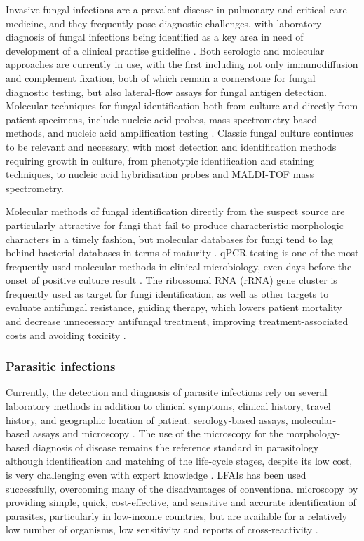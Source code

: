 Invasive fungal infections are a prevalent disease in pulmonary and critical care medicine, and they frequently pose diagnostic challenges, with laboratory diagnosis of fungal infections being identified as a key area in need of development of a clinical practise guideline \citep{haydour_diagnosis_2019}. Both serologic and molecular approaches are currently in use, with the first including not only immunodiffusion and complement fixation, both of which remain a cornerstone for fungal diagnostic testing, but also lateral-flow assays for fungal antigen detection. Molecular techniques for fungal identification both from culture and directly from patient specimens, include nucleic acid probes, mass spectrometry-based methods, and nucleic acid amplification testing \citep{ramanan_laboratory_2017}. Classic fungal culture continues to be relevant and necessary, with most detection and identification methods requiring growth in culture, from phenotypic identification and staining techniques, to nucleic acid hybridisation probes and MALDI-TOF mass spectrometry.  

Molecular methods of fungal identification directly from the suspect source are particularly attractive for fungi that fail to produce characteristic morphologic characters in a timely fashion, but molecular databases for fungi tend to lag behind bacterial databases in terms of maturity \citep{ramanan_laboratory_2017}. qPCR testing  is one of the most frequently used
molecular methods in clinical microbiology, even days before the onset of positive culture result \citep{kourkoumpetis_polymerase_2012}. The ribossomal RNA (rRNA) gene cluster is frequently used as target for fungi identification, as well as other targets to evaluate antifungal resistance, guiding therapy, which lowers patient mortality and decrease unnecessary antifungal treatment, improving treatment-associated costs and avoiding toxicity \citep{kourkoumpetis_polymerase_2012}. 

\subsubsection{Parasitic infections}

Currently, the detection and diagnosis of parasite infections rely on several laboratory methods in addition to clinical symptoms, clinical history, travel history, and geographic location of patient. serology-based assays, molecular-based assays and microscopy  \citep{ndao_diagnosis_2009}. The use of the microscopy for the morphology-based diagnosis of disease remains the reference standard in parasitology although identification and matching of the life-cycle stages, despite its low cost, is very challenging even with expert knowledge \citep{blasco-costa_molecular_2016}. LFAIs has been used successfully, overcoming many of the disadvantages of conventional microscopy by providing simple, quick, cost-effective, and sensitive and accurate identification of parasites, particularly in low-income countries, but are available for a relatively low number of organisms, low sensitivity and reports of cross-reactivity \citep{momcilovic_rapid_2019, robert-gangneux_epidemiology_2012, noauthor_false_nodate}. 

